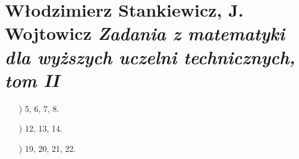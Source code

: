 \documentclass[a4paper,11pt]{article}
\numberwithin{equation}{section}
\begin{document}
\section{Włodzimierz Stankiewicz, J. Wojtowicz
  \textit{Zadania z matematyki dla wyższych uczelni
    technicznych, tom II}}

\label{sec:Oznaczenia-i-konwencje}


\begin{itemize}

\item[\romannumeral1)] 5, 6, 7, 8.

\item[\romannumeral2)] 12, 13, 14.

\item[\romannumeral3)] 19, 20, 21, 22.


\end{itemize}
\end{document}
